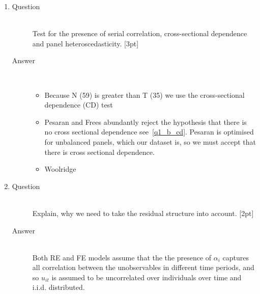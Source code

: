 \documentclass{article}
\begin{document}
\begin{enumerate}
\begin{enumerate}[label=(\alph*)]
\begin{description}
    \end{description}
    \item 
    \begin{description}
      \item[Question] \hfill \\
      Test for the presence of serial correlation, cross-sectional dependence and panel heteroscedasticity. [3pt]
      \item[Answer] \hfill \\
      \begin{itemize}
        \item Because N (59) is greater than T (35) we use the cross-sectional dependence (CD) test
        \item Pesaran and Frees abundantly reject the hypothesis that there is no cross sectional dependence see~\ref{q1_b_cd}. Pesaran is optimised for unbalanced panels, which our dataset is, so we must accept that there is cross sectional dependence.
      \begin{figure}
      
      \end{figure}
      \item Woolridge
      \begin{figure}
      
      \end{figure}
      \end{itemize}
    \end{description}
    \item 
    \begin{description}
      \item[Question] \hfill \\
      Explain, why we need to take the residual structure into account. [2pt]
      \item[Answer] \hfill \\
      Both RE and FE models assume that the the presence of \(\alpha_i\) captures all correlation between the unobservables in different time periods, and so \(u_{it}\) is assumed to be uncorrelated over individuals over time and i.i.d. distributed.
      

\end{description}
\end{enumerate}
\end{enumerate}
\end{document}
